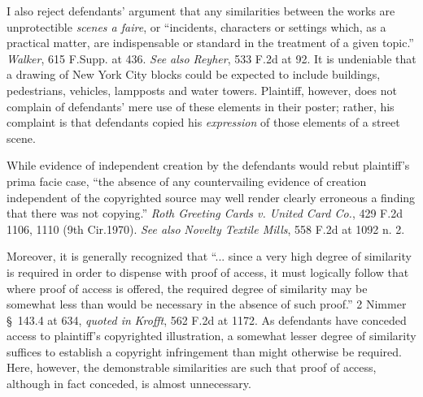 I also reject defendants' argument that any similarities between the works are
unprotectible \textit{scenes a faire}, or ``incidents, characters or settings
which, as a practical matter, are indispensable or standard in the treatment of
a given topic.'' \textit{Walker}, 615 F.Supp. at 436. \textit{See also}
\textit{Reyher}, 533 F.2d at 92. It is undeniable that a drawing of New York
City blocks could be expected to include buildings, pedestrians, vehicles,
lampposts and water towers. Plaintiff, however, does not complain of defendants'
mere use of these elements in their poster; rather, his complaint is that
defendants  copied his \textit{expression} of those elements of a street scene.

While evidence of independent creation by the defendants would rebut plaintiff's
prima facie case, ``the absence of any countervailing evidence of creation
independent of the copyrighted source may well render clearly erroneous a
finding that there was not copying.'' \textit{Roth Greeting Cards v. United Card
Co.}, 429 F.2d 1106, 1110 (9th Cir.1970). \textit{See also} \textit{Novelty
Textile Mills}, 558 F.2d at 1092 n. 2.

Moreover, it is generally recognized that ``... since a very high degree of
similarity is required in order to dispense with proof of access, it must
logically follow that where proof of access is offered, the required degree of
similarity may be somewhat less than would be necessary in the absence of such
proof.'' 2 Nimmer \S~143.4 at 634, \textit{quoted in} \textit{Krofft}, 562 F.2d
at 1172. As defendants have conceded access to plaintiff's copyrighted
illustration, a somewhat lesser degree of similarity suffices to establish a
copyright infringement than might otherwise be required. Here, however, the
demonstrable similarities are such that proof of access, although in fact
conceded, is almost unnecessary.



